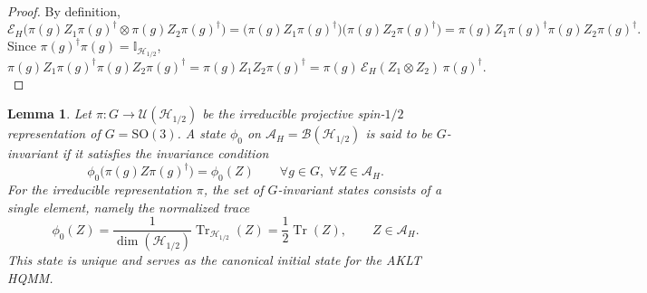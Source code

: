 \documentclass[12pt,a4paper]{article}
\newtheorem{lemma}[theorem]{Lemma}
\begin{document}
\begin{proof}
By definition,
\[
\mathcal{E}_H\bigl( \pi(g) Z_1 \pi(g)^\dagger \otimes \pi(g) Z_2 \pi(g)^\dagger \bigr) = \bigl( \pi(g) Z_1 \pi(g)^\dagger \bigr) \bigl( \pi(g) Z_2 \pi(g)^\dagger \bigr) = \pi(g) Z_1 \pi(g)^\dagger \pi(g) Z_2 \pi(g)^\dagger.
\]
Since $\pi(g)^\dagger \pi(g) = \mathbb{I}_{\mathcal{H}_{1/2}}$,
\[
\pi(g) Z_1 \pi(g)^\dagger \pi(g) Z_2 \pi(g)^\dagger = \pi(g) Z_1 Z_2 \pi(g)^\dagger = \pi(g) \, \mathcal{E}_H(Z_1 \otimes Z_2) \, \pi(g)^\dagger.
\]
\end{proof}
\begin{lemma}\label{lem:aklt_initial_invariance}
Let $\pi: G \to \mathcal{U}(\mathcal{H}_{1/2})$ be the irreducible projective spin-$1/2$ representation of $G = \mathrm{SO}(3)$. A state $\phi_0$ on $\mathcal{A}_H = \mathcal{B}(\mathcal{H}_{1/2})$ is said to be $G$-invariant if it satisfies the invariance condition
\begin{equation}
\phi_0\bigl( \pi(g) Z \pi(g)^\dagger \bigr) = \phi_0(Z) \qquad \forall g \in G,\; \forall Z \in \mathcal{A}_H.
\label{eq:aklt_initial_invariance}
\end{equation}
For the irreducible representation $\pi$, the set of $G$-invariant states consists of a single element, namely the normalized trace
\[
\phi_0(Z) = \frac{1}{\dim(\mathcal{H}_{1/2})} \operatorname{Tr}_{\mathcal{H}_{1/2}}(Z) = \frac{1}{2} \operatorname{Tr}(Z), \qquad Z \in \mathcal{A}_H.
\]
This state is unique and serves as the canonical initial state for the AKLT HQMM.
\end{lemma}
\end{document}
